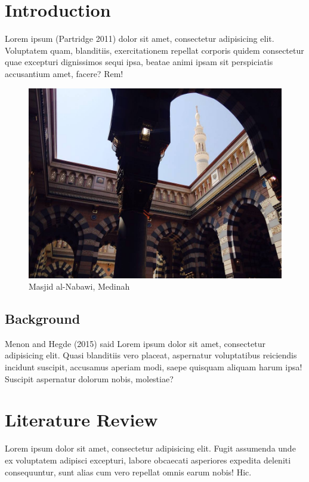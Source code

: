 \chapter{Introduction}\label{introduction}

Lorem ipsum (Partridge 2011) dolor sit amet, consectetur adipisicing
elit. Voluptatem quam, blanditiis, exercitationem repellat corporis
quidem consectetur quae excepturi dignissimos sequi ipsa, beatae animi
ipsam sit perspiciatis accusantium amet, facere? Rem!

\begin{figure}
\centering
\includegraphics[width=1.00000\textwidth]{figure.jpg}
\caption{Masjid al-Nabawi, Medinah}
\end{figure}

\section{Background}\label{background}

Menon and Hegde (2015) said Lorem ipsum dolor sit amet, consectetur
adipisicing elit. Quasi blanditiis vero placeat, aspernatur voluptatibus
reiciendis incidunt suscipit, accusamus aperiam modi, saepe quisquam
aliquam harum ipsa! Suscipit aspernatur dolorum nobis, molestiae?

\chapter{Literature Review}\label{literature-review}

Lorem ipsum dolor sit amet, consectetur adipisicing elit. Fugit
assumenda unde ex voluptatem adipisci excepturi, labore obcaecati
asperiores expedita deleniti consequuntur, sunt alias cum vero repellat
omnis earum nobis! Hic.


